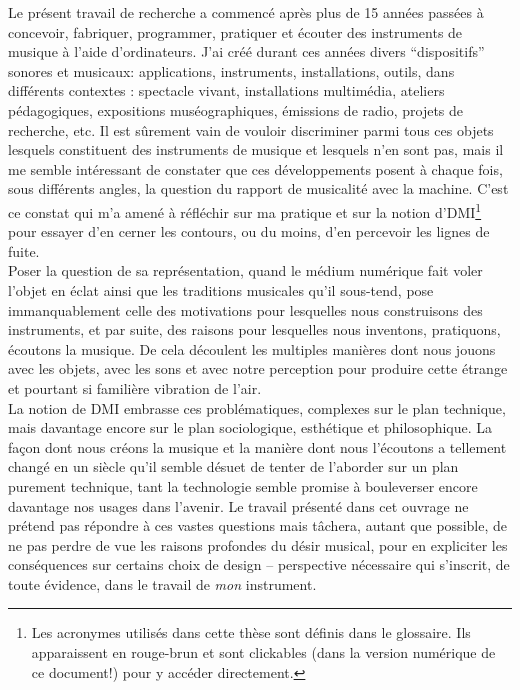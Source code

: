 \indent Le présent travail de recherche a commencé après plus de 15 années passées à concevoir, fabriquer, programmer, pratiquer et écouter des instruments de musique à l'aide d'ordinateurs. J'ai créé durant ces années divers ``dispositifs'' sonores et musicaux: applications, instruments, installations, outils, dans différents contextes : spectacle vivant, installations multimédia, ateliers pédagogiques, expositions muséographiques, émissions de radio, projets de recherche, etc. Il est sûrement vain de vouloir discriminer parmi tous ces objets lesquels constituent des instruments de musique et lesquels n'en sont pas, mais il me semble intéressant de constater que ces développements posent à chaque fois, sous différents angles, la question du rapport de musicalité avec la machine. C'est ce constat qui m'a amené à réfléchir sur ma pratique et sur la notion d'\gls{DMI}\footnote{Les acronymes utilisés dans cette thèse sont définis dans le glossaire. Ils apparaissent en \textcolor{glscolor}{rouge-brun} et sont clickables (dans la version numérique de ce document!) pour y accéder directement.} pour essayer d'en cerner les contours, ou du moins, d'en percevoir les lignes de fuite.\\
\indent Poser la question de sa représentation, quand le médium numérique fait voler l’objet en éclat ainsi que les traditions musicales qu’il sous-tend, pose immanquablement celle des motivations pour lesquelles nous construisons des instruments, et par suite, des raisons pour lesquelles nous inventons, pratiquons, écoutons la musique. De cela découlent les multiples manières dont nous jouons avec les objets, avec les sons et avec notre perception pour produire cette étrange et pourtant si familière vibration de l'air.\\
\indent La notion de \gls{DMI} embrasse ces problématiques, complexes sur le plan technique, mais davantage encore sur le plan sociologique, esthétique et philosophique. La façon dont nous créons la musique et la manière dont nous l’écoutons a tellement changé en un siècle qu’il semble désuet de tenter de l’aborder sur un plan purement technique, tant la technologie semble promise à bouleverser encore davantage nos usages dans l’avenir. Le travail présenté dans cet ouvrage ne prétend pas répondre à ces vastes questions mais tâchera, autant que possible, de ne pas perdre de vue les raisons profondes du désir musical, pour en expliciter les conséquences sur certains choix de design -- perspective nécessaire qui s'inscrit, de toute évidence, dans le travail de \textit{mon} instrument.

